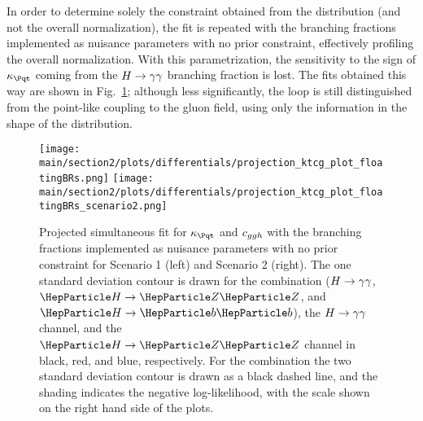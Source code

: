 In order to determine solely the constraint obtained from the distribution (and not the overall normalization), the fit is repeated with the branching fractions implemented as nuisance parameters with no prior constraint, effectively profiling the overall normalization.
% 
With this parametrization, the sensitivity to the sign of $\kappat$ coming from the $H\rightarrow\gamma\gamma$ branching fraction is lost.
% 
The fits obtained this way are shown in Fig.~\ref{fig:ktcg_couplingdependentBRs}; although less significantly, the loop is still distinguished from the point-like coupling to the gluon field, using only the information in the shape of the distribution.

\begin{figure}[hbtp]
  \begin{center}
    \texttt{[image: \\main/section2/plots/differentials/projection\_ktcg\_plot\_floatingBRs.png]}
    \texttt{[image: \\main/section2/plots/differentials/projection\_ktcg\_plot\_floatingBRs\_scenario2.png]}
    \caption{
        Projected simultaneous fit for $\kappat$ and $c_{ggh}$ with the branching fractions implemented as nuisance parameters with no prior constraint for Scenario 1 (left) and Scenario 2 (right).
        The one standard deviation contour is drawn for the combination ($H\rightarrow\gamma\gamma$, $\hzz$, and $\hbb$), the $H\rightarrow\gamma\gamma$ channel, and the $\hzz$ channel in black, red, and blue, respectively.
        For the combination the two standard deviation contour is drawn as a black dashed line, and the shading indicates the negative log-likelihood, with the scale shown on the right hand side of the plots.
        }
    \label{fig:ktcg_couplingdependentBRs}
  \end{center}
\end{figure}




